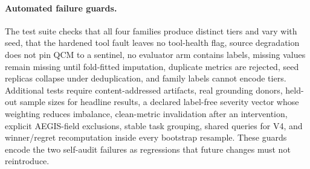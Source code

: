 \documentclass{article}
\begin{document}
\paragraph{Automated failure guards.}
The test suite checks that all four families produce distinct tiers and vary with seed, that
the hardened tool fault leaves no tool-health flag, source degradation does not pin QCM to a
sentinel, no evaluator arm contains labels, missing values remain missing until fold-fitted
imputation, duplicate metrics are rejected, seed replicas collapse under deduplication, and
family labels cannot encode tiers. Additional tests require content-addressed artifacts,
real grounding donors, held-out sample sizes for headline results, a declared label-free
severity vector whose weighting reduces imbalance, clean-metric invalidation after an
intervention, explicit AEGIS-field exclusions, stable task grouping, shared queries for V4,
and winner/regret recomputation inside every bootstrap resample. These guards encode the two
self-audit failures as regressions that future changes must not reintroduce.
\end{document}

